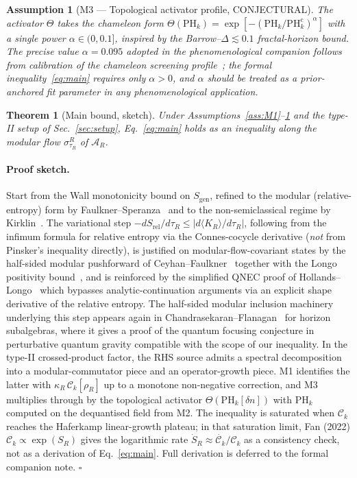 \documentclass[aps,prd,superscriptaddress,nofootinbib,floatfix,10pt]{revtex4-2}
\newtheorem{theorem}{Theorem}
\newtheorem{assumption}{Assumption}
\theoremstyle{remark}
\newcommand{\Sgen}{S_{\mathrm{gen}}}
\newcommand{\tauR}{\tau_{R}}
\newcommand{\kR}{\kappa_{R}}
\newcommand{\Ck}{\mathcal{C}_{k}}
\newcommand{\PHk}{\mathrm{PH}_{k}}
\newcommand{\dn}{\delta n}
\newcommand{\AR}{\mathcal{A}_{R}}
\begin{document}
\begin{assumption}[M3 --- Topological activator profile, CONJECTURAL]
\label{ass:M3}
The activator $\Theta$ takes the chameleon form
$\Theta(\PHk) = \exp\!\left[-(\PHk/\PHk^{\mathrm{c}})^{\alpha}\right]$
with a single power $\alpha \in (0, 0.1]$, inspired by the
Barrow--$\Delta \lesssim 0.1$ fractal-horizon bound. The precise value
$\alpha = 0.095$ adopted in the phenomenological companion follows
from calibration of the chameleon screening profile~\cite{KhouryWeltman2004};
the formal inequality~\eqref{eq:main} requires only $\alpha > 0$, and
$\alpha$ should be treated as a prior-anchored fit parameter in any
phenomenological application.
\end{assumption}

\begin{theorem}[Main bound, sketch]
\label{thm:main}
Under Assumptions~\ref{ass:M1}--\ref{ass:M3} and the type-II setup
of Sec.~\ref{sec:setup}, Eq.~\eqref{eq:main} holds as an inequality
along the modular flow $\sigma^{R}_{\tauR}$ of $\AR$.
\end{theorem}

\paragraph{Proof sketch.}
Start from the Wall monotonicity bound on $\Sgen$, refined to the
modular (relative-entropy) form by
Faulkner--Speranza~\cite{FaulknerSperanza2024} and to the
non-semiclassical regime by Kirklin~\cite{Kirklin2025}. The
variational step $-dS_{\mathrm{rel}}/d\tauR \le |d\langle K_{R}\rangle/d\tauR|$,
following from the infimum formula for relative entropy via the
Connes-cocycle derivative (\emph{not} from Pinsker's inequality
directly), is justified on modular-flow-covariant states by the
half-sided modular pushforward of
Ceyhan--Faulkner~\cite{CeyhanFaulkner2020} together with
the Longo positivity bound~\cite{Longo2019}, and is reinforced by the
simplified QNEC proof of Hollands--Longo~\cite{HollandsLongo2025QNEC}
which bypasses analytic-continuation arguments via an explicit shape
derivative of the relative entropy. The half-sided modular
inclusion machinery underlying this step appears again in
Chandrasekaran--Flanagan~\cite{ChandrasekaranFlanagan2026} for
horizon subalgebras, where it gives a proof of the quantum focusing
conjecture in perturbative quantum gravity compatible with the
scope of our inequality. In the
type-II crossed-product factor, the RHS source admits a spectral
decomposition into a modular-commutator piece and an operator-growth
piece. M1 identifies the latter with $\kR\,\Ck[\rho_{R}]$ up to a
monotone non-negative correction, and M3 multiplies through by the
topological activator $\Theta(\PHk[\dn])$ with $\PHk$ computed on the
dequantised field from M2. The inequality is saturated when $\Ck$
reaches the Haferkamp linear-growth plateau; in that saturation limit,
Fan (2022) $\Ck \propto \exp(S_{R})$ gives the logarithmic rate
$\dot{S}_{R} \approx \dot{\Ck}/\Ck$ as a consistency check, not as a
derivation of Eq.~\eqref{eq:main}. Full derivation is deferred to the
formal companion note. $\square$
\end{document}
